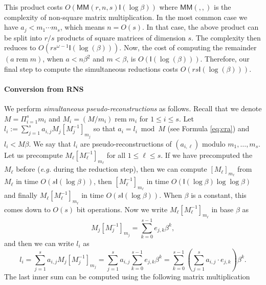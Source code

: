 \documentclass[acmtoms]{acmsmall}
\def\M{\mathsf{M}}
\def\I{\mathsf{I}}
\newcommand{\tmop}[1]{\ensuremath{\operatorname{#1}}}
\newcommand{\assign}{:=}
\newcommand{\rem}{\tmop{rem}}
\begin{document}
This product costs $O( \M\M(r,n,s) \I(\log \beta))$ 
where $\M\M(,,)$ is the complexity of non-square matrix multiplication. In the most common
case we have $a_j < m_1 \cdots m_s$, which means $n = O(s)$. In that case, the above product can be 
split into $r / s$ products of square matrices of dimension $s$. The complexity then
reduces to $O(rs^{\omega - 1} \I (\log (\beta)))$. Now, the cost of computing the remainder
$(a \rem m)$, when $a < n \beta^2$ and $m < \beta$, is
$O \left( \I (\log (\beta)) \right)$. Therefore, our final step to compute the simultaneous 
reductions costs $O \left( r s \I (\log (\beta)) \right)$.

\paragraph{Conversion from RNS}
We perform \textit{simultaneous pseudo-reconstructions} as follows.
Recall that we denote $M=\Pi_{i=1}^sm_i$ and $M_i=(M/m_i) \rem m_i$ for
$1 \leqslant i \leqslant s$.  Let $l_i \assign \sum_{j = 1}^s a_{i, j} M_j [M_j^{- 1}]_{m_j}$ so 
that $a_i = l_i \bmod M$ (see Formula \eqref{eq:cra}) and $l_i < M \beta$. We say
that $l_i$ are pseudo-reconstructions of $(a_{i, \ell})$ modulo
$m_1, \ldots, m_s$. Let us precompute $M_{\ell} [M_{\ell}^{- 1}]_{m_{\ell}}$ for all
$1 \leqslant \ell \leqslant s$. If we have precomputed the $M_\ell$ before
(\emph{e.g.} during the reduction step), then we can compute
$[M_{\ell}]_{m_{\ell}}$ from $M_\ell$ in time $O(s \I(\log \beta))$, then
$[M_{\ell}^{-1}]_{m_{\ell}}$ in time $O(\I(\log \beta) \log \log \beta)$ and
finally $M_{\ell} [M_{\ell}^{- 1}]_{m_{\ell}}$ in time
$O(s \I(\log \beta))$. When $\beta$ is a constant, this comes down to
$O(s)$ bit operations. Now we write $M_{\ell} [M_{\ell}^{- 1}]_{m_{\ell}}$ in base $\beta$ as
\[
M_j [M_j^{- 1}]_{m_j} = \sum_{k = 0}^{s - 1} e_{j, k} \beta^k,
\]
and then we can write $l_i$ as
\[ 
l_i = \sum_{j = 1}^s a_{i, j} M_j [M_j^{- 1}]_{m_j} = \sum_{j = 1}^s
a_{i, j} \sum_{k = 0}^{s - 1} e_{j, k} \beta^k = \sum_{k = 0}^{s - 1} \left(
  \sum_{j = 1}^s a_{i, j} \cdot e_{j, k} \right) \beta^k . 
\]
The last inner sum can be computed using the following matrix multiplication
\end{document}
